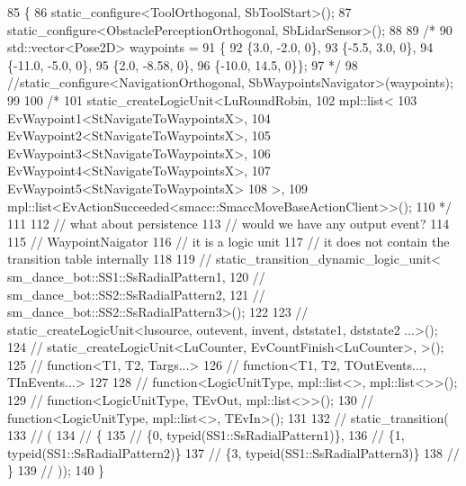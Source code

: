 \begin{DoxyCode}
85   \{
86     static\_configure<ToolOrthogonal, SbToolStart>();
87     static\_configure<ObstaclePerceptionOrthogonal, SbLidarSensor>();
88 
89     \textcolor{comment}{/*}
90 \textcolor{comment}{    std::vector<Pose2D> waypoints =}
91 \textcolor{comment}{        \{}
92 \textcolor{comment}{            \{3.0, -2.0, 0\},}
93 \textcolor{comment}{            \{-5.5, 3.0, 0\},}
94 \textcolor{comment}{            \{-11.0, -5.0, 0\},}
95 \textcolor{comment}{            \{2.0, -8.58, 0\},}
96 \textcolor{comment}{            \{-10.0, 14.5, 0\}\};}
97 \textcolor{comment}{*/}
98     \textcolor{comment}{//static\_configure<NavigationOrthogonal, SbWaypointsNavigator>(waypoints);}
99 
100     \textcolor{comment}{/*}
101 \textcolor{comment}{    static\_createLogicUnit<LuRoundRobin, }
102 \textcolor{comment}{                              mpl::list<}
103 \textcolor{comment}{                                   EvWaypoint1<StNavigateToWaypointsX>,}
104 \textcolor{comment}{                                   EvWaypoint2<StNavigateToWaypointsX>,}
105 \textcolor{comment}{                                   EvWaypoint3<StNavigateToWaypointsX>, }
106 \textcolor{comment}{                                   EvWaypoint4<StNavigateToWaypointsX>,}
107 \textcolor{comment}{                                   EvWaypoint5<StNavigateToWaypointsX>}
108 \textcolor{comment}{                                  >, }
109 \textcolor{comment}{                         mpl::list<EvActionSucceeded<smacc::SmaccMoveBaseActionClient>>();}
110 \textcolor{comment}{                         */}
111 
112     \textcolor{comment}{// what about persistence}
113     \textcolor{comment}{// would we have any output event?}
114 
115     \textcolor{comment}{// WaypointNaigator}
116     \textcolor{comment}{// it is a logic unit}
117     \textcolor{comment}{// it does not contain the transition table internally}
118 
119     \textcolor{comment}{// static\_transition\_dynamic\_logic\_unit< sm\_dance\_bot::SS1::SsRadialPattern1,}
120     \textcolor{comment}{//                                       sm\_dance\_bot::SS2::SsRadialPattern2,}
121     \textcolor{comment}{//                                       sm\_dance\_bot::SS2::SsRadialPattern3>();}
122 
123     \textcolor{comment}{// static\_createLogicUnit<lusource, outevent, invent, dststate1, dststate2 ...>();}
124     \textcolor{comment}{// static\_createLogicUnit<LuCounter, EvCountFinish<LuCounter>,    >();}
125     \textcolor{comment}{// function<T1, T2, Targs...>}
126     \textcolor{comment}{// function<T1, T2, TOutEvents..., TInEvents...>}
127 
128     \textcolor{comment}{// function<LogicUnitType, mpl::list<>, mpl::list<>>();}
129     \textcolor{comment}{// function<LogicUnitType, TEvOut, mpl::list<>>();}
130     \textcolor{comment}{// function<LogicUnitType, mpl::list<>, TEvIn>();}
131 
132     \textcolor{comment}{// static\_transition(}
133     \textcolor{comment}{// (}
134     \textcolor{comment}{//   \{}
135     \textcolor{comment}{//     \{0, typeid(SS1::SsRadialPattern1)\},}
136     \textcolor{comment}{//     \{1, typeid(SS1::SsRadialPattern2)\}}
137     \textcolor{comment}{//     \{3, typeid(SS1::SsRadialPattern3)\}}
138     \textcolor{comment}{//   \}}
139     \textcolor{comment}{// ));}
140   \}
\end{DoxyCode}
